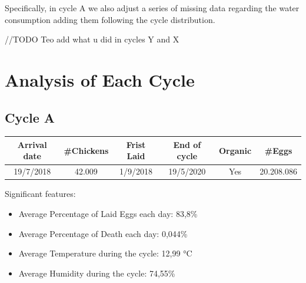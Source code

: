 \documentclass[11pt]{article}
\begin{document}
Specifically, in cycle A we also adjust a series of missing data regarding the water consumption adding them following the cycle distribution.

//TODO Teo add what u did in cycles Y and X


\section{Analysis of Each Cycle}
\subsection{Cycle A}
\begin{center}
    \begin{tabular}{|c | c | c | c | c | c|} 
        \hline
        \textbf{Arrival date} & \textbf{\#Chickens} & \textbf{Frist Laid} & \textbf{End of cycle} & \textbf{Organic} & \textbf{\#Eggs}\\ [0.5ex] 
        \hline
        19/7/2018 & 42.009 & 1/9/2018 & 19/5/2020 & Yes & 20.208.086\\
        \hline
    \end{tabular}
\end{center}
Significant features:
\begin{itemize}
    \item Average Percentage of Laid Eggs each day: 83,8\%
    \item Average Percentage of Death each day: 0,044\%
    \item Average Temperature during the cycle: 12,99 °C
    \item Average Humidity during the cycle: 74,55\%
\end{itemize}
\end{document}
